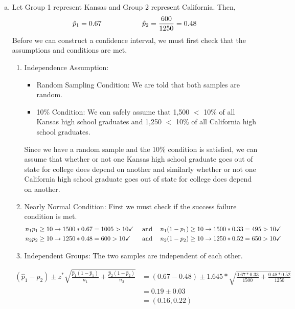 {
\begin{enumerate}[(a)]
\item Let Group 1 represent Kansas and Group 2 represent California. Then,
\[ \hat{p}_1 = 0.67 \hspace{20mm} \hat{p}_2 = \frac{600}{1250} = 0.48 \]
Before we can construct a confidence interval, we must first check that the assumptions and conditions are met.
\begin{enumerate}[1.]
\item Independence Assumption: 
\begin{itemize}
\item Random Sampling Condition: We are told that both samples are random.
\item 10\% Condition: We can safely assume that 1,500 $<$ 10\% of all Kansas high school graduates and 1,250 $<$ 10\% of all California high school graduates.
\end{itemize}
Since we have a random sample and the 10\% condition is satisfied, we can assume that whether or not one Kansas high school graduate goes out of state for college does depend on another and similarly whether or not one California high school graduate goes out of state for college does depend on another.
\item Nearly Normal Condition: First we must check if the success failure condition is met.
\begin{align*}
n_1p_1 &\ge 10 \rightarrow 1500 * 0.67 = 1005 > 10 \checkmark &\text{  and \hspace{2mm} } n_1(1 - p_1) &\ge 10 \rightarrow 1500 * 0.33 = 495 > 10 \checkmark \\
n_2p_2 &\ge 10 \rightarrow 1250 * 0.48 = 600 > 10 \checkmark &\text{  and \hspace{2mm} } n_2(1 - p_2) &\ge 10 \rightarrow 1250 * 0.52 = 650 > 10 \checkmark \\
\end{align*}
\item Independent Groups: The two samples are independent of each other.
\end{enumerate}

\begin{align*}
(\hat{p}_1 - \hat{p}_2) \pm z^*\sqrt{ \frac{\hat{p}_1 (1 - \hat{p}_1)}{n_1} + \frac{\hat{p}_2 (1 - \hat{p}_2)}{n_2} } &= (0.67 - 0.48) \pm 1.645 *  \sqrt{ \frac{0.67 * 0.33}{1500} + \frac{0.48 * 0.52}{1250} } \\
&= 0.19 \pm 0.03 \\
&= (0.16,0.22)
\end{align*}


\end{enumerate}}
